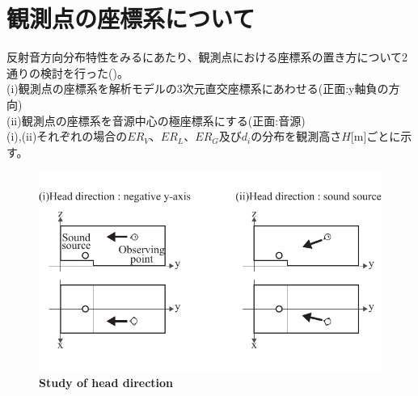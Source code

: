 \pagebreak
\section{観測点の座標系について}
反射音方向分布特性をみるにあたり、観測点における座標系の置き方について2通りの検討を行った()。\\
(i)観測点の座標系を解析モデルの3次元直交座標系にあわせる(正面:y軸負の方向)\\
(ii)観測点の座標系を音源中心の極座標系にする(正面:音源)\\
(i),(ii)それぞれの場合の$ER_V$、$ER_L$、$ER_G$及び$d_i$の分布を観測高さ$H$[m]ごとに示す。

\begin{figure}[htbp]
    \centering
    \includegraphics[keepaspectratio,scale=1]{05_att/observing.pdf}
    \caption{\hspace{1mm}\textbf{Study of head direction}}
    \label{fig:observing}
\end{figure}




